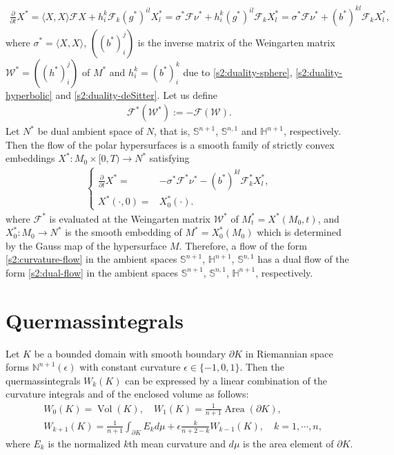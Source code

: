 \documentclass[11pt,reqno]{amsart}
\theoremstyle{definition}
\theoremstyle{remark}
\numberwithin{equation}{section}
\renewcommand{\(}{\left(}
\renewcommand{\)}{\right)}
\renewcommand{\~}{\tilde}
\renewcommand{\-}{\overline}
\newcommand{\e}{\epsilon}
\newcommand{\s}{\sigma}
\newcommand{\ra}{\rightarrow}
\begin{document}
\begin{align*}
\frac{\partial}{\partial t}X^\ast=\langle X,X\rangle \mathcal{F}X+ h_i^k \mathcal{F}_{k} (g^\ast)^{il}X^\ast_l=\s^\ast \mathcal{F} \nu^\ast+ h_i^k (g^\ast)^{il} \mathcal{F}_k X^\ast_{l}=\s^\ast \mathcal{F} \nu^\ast+ (b^\ast)^{kl} \mathcal{F}_k X^\ast_{l},
\end{align*}
where $\s^{\ast}=\langle X,X\rangle$, $((b^{\ast})_i^j)$ is the inverse matrix of the Weingarten matrix $\mathcal{W}^\ast=((h^{\ast})_i^j)$ of $M^\ast$ and $h_i^k=(b^{\ast})_i^k$ due to \eqref{s2:duality-sphere}, \eqref{s2:duality-hyperbolic} and \eqref{s2:duality-deSitter}. Let us define  
\begin{align}\label{s2:dual-function}
\mathcal{F}^\ast(\mathcal{W}^\ast):=-\mathcal{F}(\mathcal{W}).
\end{align}
Let $N^\ast$ be dual ambient space of $N$, that is, $\mathbb S^{n+1}$, $\mathbb S^{n,1}$ and $\mathbb H^{n+1}$, respectively. Then the flow of the polar hypersurfaces is a smooth family of strictly convex embeddings $X^\ast:M_0\times [0,T)\ra N^\ast$ satisfying
\begin{align}\label{s2:dual-flow}
\left\{
\begin{aligned}
\frac{\partial}{\partial t}X^\ast=&-\s^{\ast} \mathcal{F}^\ast \nu^\ast-(b^\ast)^{kl}\mathcal{F}^\ast_{k}X^\ast_l, \\
X^\ast(\cdot,0)=&X^\ast_0(\cdot).
\end{aligned}\right.
\end{align}
where $\mathcal{F}^{\ast}$ is evaluated at the Weingarten matrix $\mathcal{W}^\ast$ of $M_t^\ast=X^\ast(M_0,t)$, and $X^\ast_0:M_0 \ra N^\ast$ is the smooth embedding of $M^\ast=X_0^{\ast}(M_0)$ which is determined by the Gauss map of the hypersurface $M$. Therefore, a flow of the form \eqref{s2:curvature-flow} in the ambient spaces $\mathbb S^{n+1}$, $\mathbb H^{n+1}$, $\mathbb S^{n,1}$ has a dual flow of the form \eqref{s2:dual-flow} in the ambient spaces $\mathbb S^{n+1}$, $\mathbb S^{n,1}$, $\mathbb H^{n+1}$, respectively.

\section{Quermassintegrals}\label{sec:3}
Let $K$ be a bounded domain with smooth boundary $\partial K$ in Riemannian space forms $\mathbb N^{n+1}(\e)$ with constant curvature $\e\in \{-1,0,1\}$. Then the quermassintegrals $W_k(K)$ can be expressed by a linear combination of the curvature integrals and of the enclosed volume as follows:
\begin{equation}\label{s1:quermassintegral-def}
\begin{split}
&W_0(K)=\operatorname{Vol}(K), \quad  W_1(K)=\frac{1}{n+1}\operatorname{Area}(\partial K), \\
&W_{k+1}(K)=\frac{1}{n+1}\int_{\partial K}E_{k}d\mu+\e\frac{k}{n+2-k}W_{k-1}(K), \quad k=1,\cdots,n,
\end{split}
\end{equation}
where $E_k$ is the normalized $k$th mean curvature and $d\mu$ is the area element of $\partial K$. 
\end{document}
